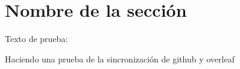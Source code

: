 \section{Nombre de la sección}

Texto de prueba:

{ \blindtext}


Haciendo una prueba de la sincronización de github y overleaf
